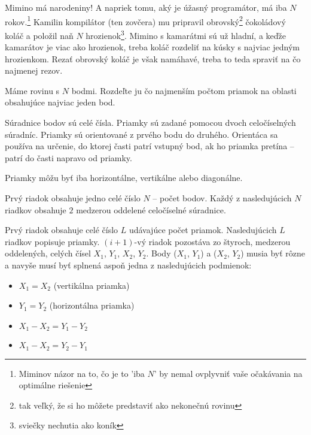 





Mimino má narodeniny!
A napriek tomu, aký je úžasný programátor, má iba $N$
rokov.\footnote{Miminov názor na to, čo je to 'iba $N$'
by nemal ovplyvniť vaše očakávania na optimálne riešenie}
Kamilin kompilátor (ten zovčera) mu pripravil obrovský\footnote{tak veľký, že si ho môžete predstaviť ako nekonečnú rovinu}
čokoládový koláč a položil naň $N$ hrozienok\footnote{sviečky nechutia ako koník}.
Mimino s kamarátmi sú už hladní, a keďže kamarátov je viac ako hrozienok,
treba koláč rozdeliť na kúsky s najviac jedným hrozienkom.
Rezať obrovský koláč je však namáhavé, treba to teda spraviť
na čo najmenej rezov.


Máme rovinu s $N$ bodmi. Rozdeľte ju čo najmenším počtom priamok na oblasti obsahujúce najviac jeden bod.

Súradnice bodov sú celé čísla. Priamky sú zadané pomocou dvoch celočíselných súradníc.
Priamky sú orientované z prvého bodu do druhého.
Orientáca sa používa na určenie, do ktorej časti patrí
vstupný bod, ak ho priamka pretína --
patrí do časti napravo od priamky.

Priamky môžu byť iba horizontálne, vertikálne alebo diagonálne.


Prvý riadok obsahuje jedno celé číslo $N$ -- počet bodov.
Každý z nasledujúcich $N$ riadkov obsahuje
$2$ medzerou oddelené celočíselné súradnice.


Prvý riadok obsahuje celé číslo $L$ udávajúce počet priamok.
Nasledujúcich $L$ riadkov popisuje priamky.
$(i+1)$-vý riadok pozostáva zo štyroch, medzerou
oddelených, celých čísel $X_1$, $Y_1$, $X_2$, $Y_2$.
Body ($X_1$, $Y_1$) a ($X_2$, $Y_2$) musia byť rôzne a
navyše musí byť splnená aspoň jedna z nasledujúcich podmienok:

\begin{itemize}
  \item $X_1 = X_2$ (vertikálna priamka)
  \item $Y_1 = Y_2$ (horizontálna priamka)
  \item $X_1 - X_2 = Y_1 - Y_2$
  \item $X_1 - X_2 = Y_2 - Y_1$
\end{itemize}

